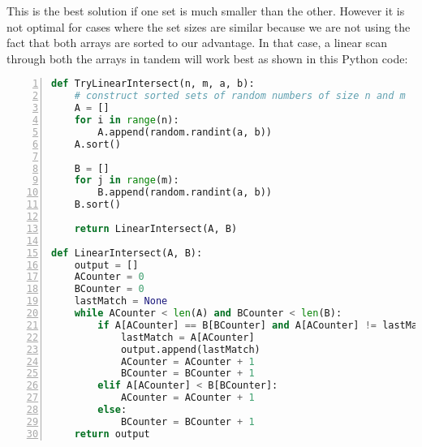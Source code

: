 \begin{comment}
For example:

If $n = 1000$ and $m = 100$, we have $1000 \cdot \log_2(100) \approx 6643$ 
If $n = 100$ and $m = 1000$, we have $100 \cdot \log_2(1000) \approx 997$

If $n = 600$ and $m = 500$, we have $600 \cdot \log_2(500) \approx 5379$
If $n = 500$ and $m = 600$, we have $500 \cdot \log_2(600) \approx 4614$

If $n = 1000$ and $m = 999$, we have $1000 \cdot \log_2(999) \approx 9964$
If $n = 500$ and $m = 600$, we have $500 \cdot \log_2(600) \approx 9955$
\end{comment}

This is the best solution if one set is much smaller than 
the other. However it is not optimal for cases where the set sizes are similar because 
we are not using the fact that both arrays are sorted to our advantage. 
In that case, a linear scan through both the arrays in tandem will work 
best as shown in this Python code:

\begin{lstlisting}[basicstyle=\footnotesize,numbers=left,breaklines=true,language=Python]
def TryLinearIntersect(n, m, a, b):
    # construct sorted sets of random numbers of size n and m
    A = []
    for i in range(n):
        A.append(random.randint(a, b))
    A.sort()
 
    B = []
    for j in range(m):
        B.append(random.randint(a, b))
    B.sort()
 
    return LinearIntersect(A, B)
 
def LinearIntersect(A, B):
    output = []
    ACounter = 0
    BCounter = 0
    lastMatch = None
    while ACounter < len(A) and BCounter < len(B):
        if A[ACounter] == B[BCounter] and A[ACounter] != lastMatch:
            lastMatch = A[ACounter]
            output.append(lastMatch)
            ACounter = ACounter + 1
            BCounter = BCounter + 1
        elif A[ACounter] < B[BCounter]:
            ACounter = ACounter + 1
        else:
            BCounter = BCounter + 1
    return output
\end{lstlisting}


